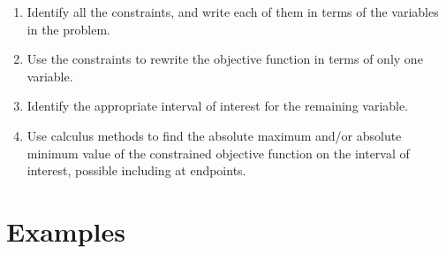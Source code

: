 \documentclass{article}
\begin{document}
\begin{itemize}
\begin{enumerate}
        \item Identify all the constraints, and write each of them in terms of the variables in the problem. \\
        \item Use the constraints to rewrite the objective function in terms of only one variable.
        \item Identify the appropriate interval of interest for the remaining variable.
        \item Use calculus methods to find the absolute maximum and/or absolute minimum value of the constrained objective function on the interval of interest, possible including at endpoints.
    \end{enumerate}
\end{itemize}

\section*{Examples}
\end{document}
